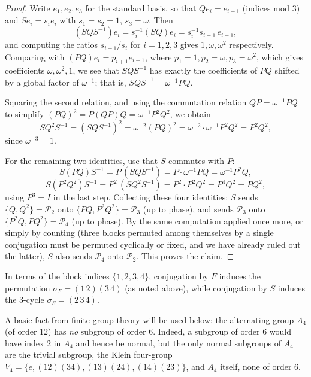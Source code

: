 \begin{proof}
    Write \( e_1,e_2,e_3 \) for the standard basis, so that
    \( Qe_i = e_{i+1} \) (indices mod \( 3 \)) and \( S e_i = s_i e_i \)
    with \( s_1 = s_2 = 1 \), \( s_3 = \omega \). Then
    \[
        (SQS^{-1})e_i = s_i^{-1}(SQ)e_i = s_i^{-1}s_{i+1}\,e_{i+1},
    \]
    and computing the ratios \( s_{i+1}/s_i \) for \( i=1,2,3 \) gives
    \( 1, \omega, \omega^2 \) respectively. Comparing with
    \( (PQ)e_i = p_{i+1}e_{i+1} \), where \( p_1=1,p_2=\omega,p_3=\omega^2 \),
    which gives coefficients \( \omega,\omega^2,1 \), we see that
    \( SQS^{-1} \) has exactly the coefficients of \( PQ \) shifted by
    a global factor of \( \omega^{-1} \); that is,
    \( SQS^{-1} = \omega^{-1}PQ \).

    Squaring the second relation, and using the commutation relation
    \( QP = \omega^{-1}PQ \) to simplify
    \( (PQ)^2 = P(QP)Q = \omega^{-1}P^2Q^2 \), we obtain
    \[
        SQ^2S^{-1} = (SQS^{-1})^2 = \omega^{-2}(PQ)^2
        = \omega^{-2}\cdot\omega^{-1}P^2Q^2 = P^2Q^2,
    \]
    since \( \omega^{-3}=1 \).

    For the remaining two identities, use that \( S \) commutes with
    \( P \):
    \[
        S(PQ)S^{-1} = P\,(SQS^{-1}) = P\cdot\omega^{-1}PQ = \omega^{-1}P^2Q,
    \]
    \[
        S(P^2Q^2)S^{-1} = P^2\,(SQ^2S^{-1}) = P^2\cdot P^2Q^2 = P^4Q^2 = PQ^2,
    \]
    using \( P^3 = I \) in the last step. Collecting these four
    identities: \( S \) sends \( \{Q,Q^2\} = \mathcal{P}_2 \) onto
    \( \{PQ, P^2Q^2\} = \mathcal{P}_3 \) (up to phase), and sends
    \( \mathcal{P}_3 \) onto \( \{P^2Q,PQ^2\} = \mathcal{P}_4 \) (up to
    phase). By the same computation applied once more, or simply by
    counting (three blocks permuted among themselves by a single
        conjugation must be permuted cyclically or fixed, and we
    have already ruled out the latter), \( S \) also sends
    \( \mathcal{P}_4 \) onto \( \mathcal{P}_2 \). This proves the claim.
\end{proof}

In terms of the block indices \( \{1,2,3,4\} \), conjugation by
\( F \) induces the permutation \( \sigma_F = (1\,2)(3\,4) \) (as noted
above), while conjugation by \( S \) induces the \( 3 \)-cycle
\( \sigma_S = (2\,3\,4) \).

\begin{remark}
    \label{rem:a4-no-subgroup-order-six}
    A basic fact from finite group theory will be used below: the
    alternating group \( A_4 \) (of order \( 12 \)) has \emph{no}
    subgroup of order \( 6 \). Indeed, a subgroup of order \( 6 \)
    would have index \( 2 \) in \( A_4 \) and hence be normal, but the
    only normal subgroups of \( A_4 \) are the trivial subgroup, the
    Klein four-group \( V_4 = \{e,(12)(34),(13)(24),(14)(23)\} \), and
    \( A_4 \) itself, none of order \( 6 \).
\end{remark}

